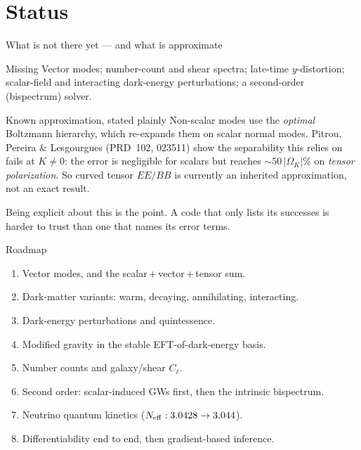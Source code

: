 \documentclass[10pt,aspectratio=43]{beamer}
\newcommand{\cl}{C_\ell}
\begin{document}
\section{Status}

\begin{frame}{What is not there yet --- and what is approximate}
  \begin{block}{Missing}
    Vector modes; number-count and shear spectra; late-time $y$-distortion;
    scalar-field and interacting dark-energy perturbations; a second-order
    (bispectrum) solver.
  \end{block}
  \begin{block}{Known approximation, stated plainly}
    Non-scalar modes use the \emph{optimal} Boltzmann hierarchy, which
    re-expands them on scalar normal modes. Pitrou, Pereira \& Lesgourgues
    (PRD~102, 023511) show the separability this relies on \alert{fails at
    $K\neq0$}: the error is negligible for scalars but reaches
    $\sim50\,|\Omega_K|\%$ on \emph{tensor polarization}. So curved tensor
    $EE/BB$ is currently an inherited approximation, not an exact result.
  \end{block}
  \vfill
  \footnotesize Being explicit about this is the point. A code that only lists
  its successes is harder to trust than one that names its error terms.
\end{frame}

\begin{frame}{Roadmap}
  \begin{enumerate}
    \item Vector modes, and the scalar\,+\,vector\,+\,tensor sum.
    \item Dark-matter variants: warm, decaying, annihilating, interacting.
    \item Dark-energy perturbations and quintessence.
    \item Modified gravity in the stable EFT-of-dark-energy basis.
    \item Number counts and galaxy/shear $\cl$.
    \item Second order: scalar-induced GWs first, then the intrinsic bispectrum.
    \item Neutrino quantum kinetics ($N_{\rm eff}:3.0428\to3.044$).
    \item Differentiability end to end, then gradient-based inference.
  \end{enumerate}
\end{frame}
\end{document}
